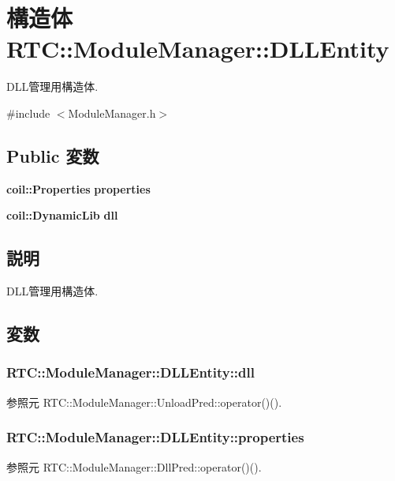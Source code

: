 \section{構造体 RTC::ModuleManager::DLLEntity}
\label{structRTC_1_1ModuleManager_1_1DLLEntity}


DLL管理用構造体.  




{\ttfamily \#include $<$ModuleManager.h$>$}

\subsection*{Public 変数}
\begin{DoxyCompactItemize}
\item 
{\bf coil::Properties} {\bf properties}
\item 
{\bf coil::DynamicLib} {\bf dll}
\end{DoxyCompactItemize}


\subsection{説明}
DLL管理用構造体. 

\subsection{変数}
\subsubsection[{dll}]{ {\bf RTC::ModuleManager::DLLEntity::dll}}\label{structRTC_1_1ModuleManager_1_1DLLEntity_afe210678e87af07ccd3d5e46d5bfaa39}


参照元 RTC::ModuleManager::UnloadPred::operator()().

\subsubsection[{properties}]{ {\bf RTC::ModuleManager::DLLEntity::properties}}\label{structRTC_1_1ModuleManager_1_1DLLEntity_a9e03f69e5fef19e24e6eeaa4a4a45835}


参照元 RTC::ModuleManager::DllPred::operator()().

